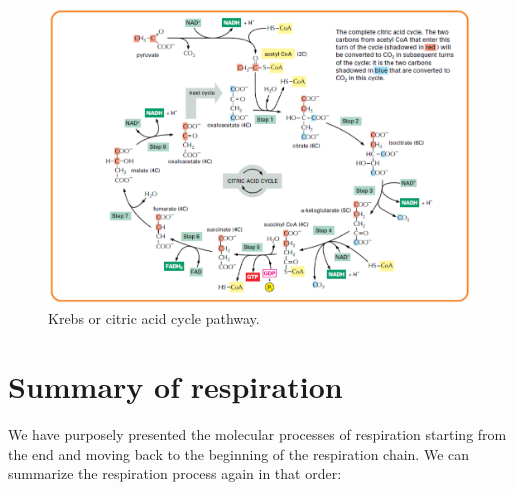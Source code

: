 \documentclass[]{book}
\theoremstyle{definition}
\theoremstyle{definition}
\theoremstyle{definition}
\theoremstyle{remark}
\begin{document}
\begin{figure}

{\centering \includegraphics[width=0.95\linewidth]{pictures/Krebscycle} 

}

\caption{Krebs or citric acid cycle pathway.}\label{fig:krebs}
\end{figure}

\section{Summary of respiration}\label{summary-of-respiration}

We have purposely presented the molecular processes of respiration
starting from the end and moving back to the beginning of the
respiration chain. We can summarize the respiration process again in
that order:
\end{document}
